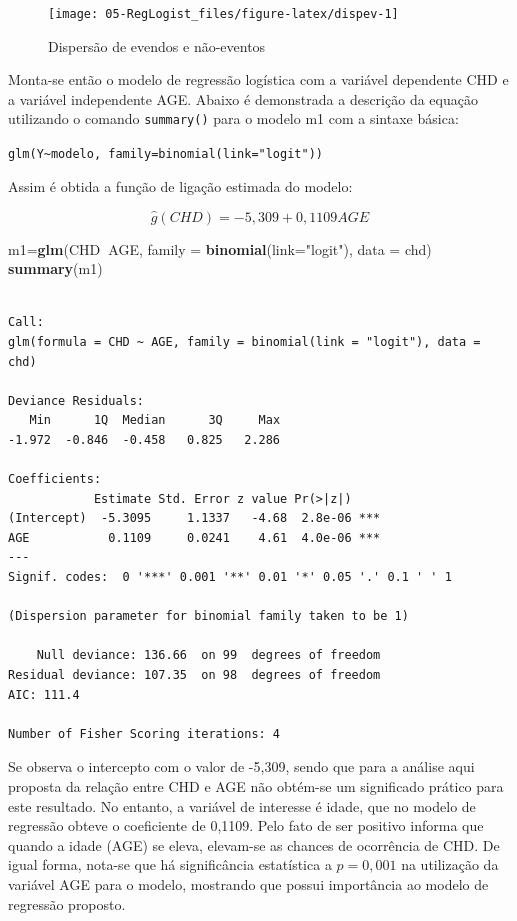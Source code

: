 \documentclass[12pt,brazil,oneside]{book}
\newenvironment{Shaded}{\begin{snugshade}}{\end{snugshade}}
\newcommand{\DataTypeTok}[1]{\textcolor[rgb]{0.13,0.29,0.53}{#1}}
\newcommand{\KeywordTok}[1]{\textcolor[rgb]{0.13,0.29,0.53}{\textbf{#1}}}
\newcommand{\NormalTok}[1]{#1}
\newcommand{\OperatorTok}[1]{\textcolor[rgb]{0.81,0.36,0.00}{\textbf{#1}}}
\newcommand{\StringTok}[1]{\textcolor[rgb]{0.31,0.60,0.02}{#1}}
\begin{document}
\begin{figure}[h]

{\centering \texttt{[image: 05-RegLogist\_files/figure-latex/dispev-1]} 

}

\caption{Dispersão de evendos e não-eventos}\label{fig:dispev}
\end{figure}

Monta-se então o modelo de regressão logística com a variável dependente
CHD e a variável independente AGE. Abaixo é demonstrada a descrição da
equação utilizando o comando \texttt{summary()} para o modelo m1 com a
sintaxe básica:

\texttt{glm(Y\textasciitilde{}modelo,\ family=binomial(link="logit"))}

Assim é obtida a função de ligação estimada do modelo:

\[
\hat g(CHD) = -5,309 +0,1109AGE
\]

\begin{Shaded}
\begin{Highlighting}[]
\NormalTok{m1=}\KeywordTok{glm}\NormalTok{(CHD}\OperatorTok{~}\NormalTok{AGE, }\DataTypeTok{family =} \KeywordTok{binomial}\NormalTok{(}\DataTypeTok{link=}\StringTok{"logit"}\NormalTok{), }\DataTypeTok{data =}\NormalTok{ chd)}
\KeywordTok{summary}\NormalTok{(m1)}
\end{Highlighting}
\end{Shaded}

\begin{verbatim}

Call:
glm(formula = CHD ~ AGE, family = binomial(link = "logit"), data = chd)

Deviance Residuals: 
   Min      1Q  Median      3Q     Max  
-1.972  -0.846  -0.458   0.825   2.286  

Coefficients:
            Estimate Std. Error z value Pr(>|z|)    
(Intercept)  -5.3095     1.1337   -4.68  2.8e-06 ***
AGE           0.1109     0.0241    4.61  4.0e-06 ***
---
Signif. codes:  0 '***' 0.001 '**' 0.01 '*' 0.05 '.' 0.1 ' ' 1

(Dispersion parameter for binomial family taken to be 1)

    Null deviance: 136.66  on 99  degrees of freedom
Residual deviance: 107.35  on 98  degrees of freedom
AIC: 111.4

Number of Fisher Scoring iterations: 4
\end{verbatim}

Se observa o intercepto com o valor de -5,309, sendo que para a análise
aqui proposta da relação entre CHD e AGE não obtém-se um significado
prático para este resultado. No entanto, a variável de interesse é
idade, que no modelo de regressão obteve o coeficiente de 0,1109. Pelo
fato de ser positivo informa que quando a idade (AGE) se eleva,
elevam-se as chances de ocorrência de CHD. De igual forma, nota-se que
há significância estatística a \(p=0,001\) na utilização da variável AGE
para o modelo, mostrando que possui importância ao modelo de regressão
proposto.
\end{document}
